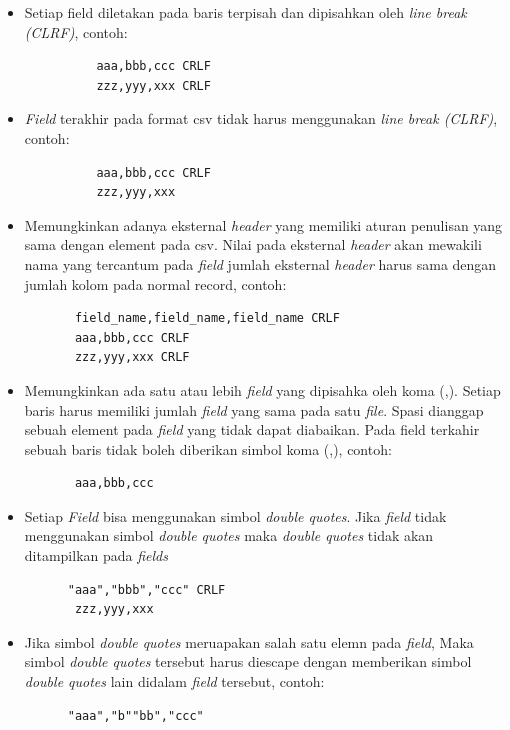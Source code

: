 \begin{itemize}
    \item Setiap field diletakan pada baris terpisah dan dipisahkan oleh \textit{line break (CLRF)}, contoh:
    \begin{lstlisting}
          aaa,bbb,ccc CRLF
          zzz,yyy,xxx CRLF
    \end{lstlisting}
    \item \textit{Field} terakhir pada format csv tidak harus menggunakan \textit{line break (CLRF)}, contoh:
        \begin{lstlisting}
          aaa,bbb,ccc CRLF
          zzz,yyy,xxx 
    \end{lstlisting}
    \item Memungkinkan adanya eksternal \textit{header} yang memiliki aturan penulisan yang sama dengan element pada csv. Nilai pada eksternal \textit{header} akan mewakili nama yang tercantum pada \textit{field} jumlah eksternal \textit{header} harus sama dengan jumlah kolom pada normal record, contoh:
    \begin{lstlisting}
       field_name,field_name,field_name CRLF
       aaa,bbb,ccc CRLF
       zzz,yyy,xxx CRLF

    \end{lstlisting}
    
    \item Memungkinkan ada satu atau lebih \textit{field} yang dipisahka oleh koma (,). Setiap baris harus memiliki jumlah \textit{field} yang sama pada satu \textit{file}. Spasi dianggap sebuah element pada \textit{field} yang tidak dapat diabaikan. Pada field terkahir sebuah baris tidak boleh diberikan simbol koma (,), contoh:
    \begin{lstlisting}
       aaa,bbb,ccc
    \end{lstlisting}
    
    \item Setiap \textit{Field} bisa menggunakan simbol \textit{double quotes}. Jika \textit{field} tidak menggunakan simbol \textit{double quotes} maka \textit{double quotes} tidak akan ditampilkan pada \textit{fields}
    \begin{lstlisting}
      "aaa","bbb","ccc" CRLF
       zzz,yyy,xxx
    \end{lstlisting}
    
    \item Jika simbol \textit{double quotes} meruapakan salah satu elemn pada \textit{field}, Maka simbol \textit{double quotes} tersebut harus diescape dengan memberikan simbol \textit{double quotes} lain didalam \textit{field} tersebut, contoh:
    \begin{lstlisting}
      "aaa","b""bb","ccc"
    \end{lstlisting}
\end{itemize}

